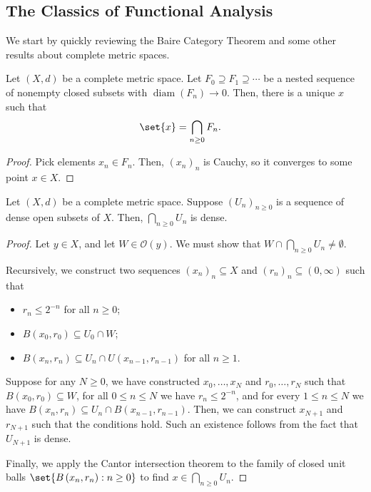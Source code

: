 \documentclass[10pt]{mypackage}
\begin{document}
\subsection{The Classics of Functional Analysis}%
We start by quickly reviewing the Baire Category Theorem and some other results about complete metric spaces.
\begin{theorem}
  Let $\left( X,d \right)$ be a complete metric space. Let $F_0\supseteq F_1\supseteq\cdots$ be a nested sequence of nonempty closed subsets with $\operatorname{diam}\left( F_n \right)\to 0$. Then, there is a unique $x$ such that
  \begin{align*}
    \set{x} &= \bigcap_{n\geq 0}F_n.
  \end{align*}
\end{theorem}
\begin{proof}
  Pick elements $x_n\in F_n$. Then, $\left( x_n \right)_n$ is Cauchy, so it converges to some point $ x\in X $.
\end{proof}
\begin{theorem}
  Let $\left( X,d \right)$ be a complete metric space. Suppose $\left( U_n \right)_{n\geq 0}$ is a sequence of dense open subsets of $X$. Then, $\bigcap_{n\geq 0}U_n$ is dense.
\end{theorem}
\begin{proof}
  Let $y\in X$, and let $W\in \mathcal{O}(y)$. We must show that $W\cap \bigcap_{n\geq 0}U_n \neq \emptyset$.

  Recursively, we construct two sequences $\left( x_n \right)_n\subseteq X$ and $\left( r_n \right)_n\subseteq (0,\infty)$ such that
  \begin{itemize}
    \item $r_n \leq 2^{-n}$ for all $n\geq 0$;
    \item $B\left( x_0,r_0 \right)\subseteq U_0\cap W$;
    \item $B\left( x_n,r_n \right)\subseteq U_n\cap U\left( x_{n-1},r_{n-1} \right)$ for all $n\geq 1$.
  \end{itemize}
  Suppose for any $N\geq 0$, we have constructed $x_0,\dots,x_N$ and $r_0,\dots,r_N$ such that $B\left( x_0,r_0 \right)\subseteq W$, for all $0\leq n \leq N$ we have $r_n\leq 2^{-n}$, and for every $1\leq n \leq N$ we have $B\left( x_n,r_n \right)\subseteq U_n\cap B\left( x_{n-1},r_{n-1} \right)$. Then, we can construct $x_{N+1}$ and $r_{N+1}$ such that the conditions hold. Such an existence follows from the fact that $U_{N+1}$ is dense.

  Finally, we apply the Cantor intersection theorem to the family of closed unit balls $\set{B\left( x_n,r_n \right) : n\geq 0}$ to find $x\in \bigcap_{n\geq 0}U_n$.
\end{proof}
\end{document}

